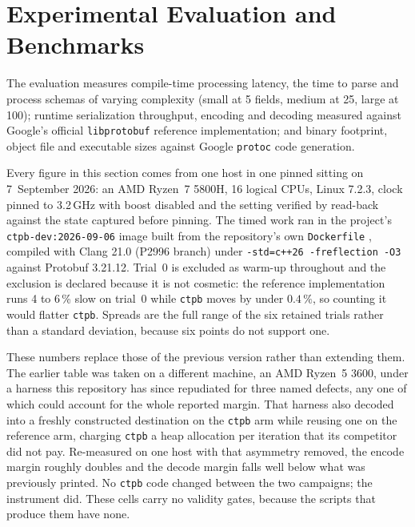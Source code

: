 \section{Experimental Evaluation and Benchmarks}

The evaluation measures compile-time processing latency, the time to parse and process schemas of varying complexity (small at 5 fields, medium at 25, large at 100); runtime serialization throughput, encoding and decoding measured against Google's official \texttt{libprotobuf} reference implementation; and binary footprint, object file and executable sizes against Google \texttt{protoc} code generation.

Every figure in this section comes from one host in one pinned sitting on 7~September 2026: an AMD Ryzen~7 5800H, 16 logical CPUs, Linux 7.2.3, clock pinned to 3.2\,GHz with boost disabled and the setting verified by read-back against the state captured before pinning. The timed work ran in the project's \texttt{ctpb-dev:2026-09-06} image built from the repository's own \texttt{Dockerfile} \cite{ctpb2026}, compiled with Clang 21.0 (P2996 branch) under \texttt{-std=c++26 -freflection -O3} against Protobuf 3.21.12. Trial~0 is excluded as warm-up throughout and the exclusion is declared because it is not cosmetic: the reference implementation runs 4 to 6\,\% slow on trial~0 while \texttt{ctpb} moves by under $0.4\,\%$, so counting it would flatter \texttt{ctpb}. Spreads are the full range of the six retained trials rather than a standard deviation, because six points do not support one.

These numbers replace those of the previous version rather than extending them. The earlier table was taken on a different machine, an AMD Ryzen~5 3600, under a harness this repository has since repudiated for three named defects, any one of which could account for the whole reported margin. That harness also decoded into a freshly constructed destination on the \texttt{ctpb} arm while reusing one on the reference arm, charging \texttt{ctpb} a heap allocation per iteration that its competitor did not pay. Re-measured on one host with that asymmetry removed, the encode margin roughly doubles and the decode margin falls well below what was previously printed. No \texttt{ctpb} code changed between the two campaigns; the instrument did. These cells carry no validity gates, because the scripts that produce them have none.

